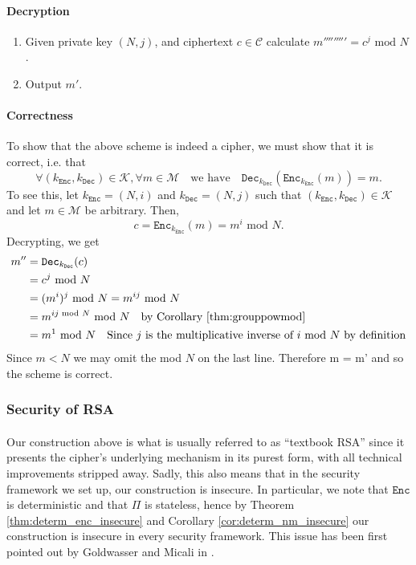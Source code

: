 \documentclass{article}
\theoremstyle{definition}
\newcommand{\Enc}{\texttt{Enc}}
\newcommand{\Dec}{\texttt{Dec}}
\newcommand{\M}{\mathcal{M}}
\renewcommand{\C}{\mathcal{C}}
\newcommand{\K}{\mathcal{K}}
\renewcommand{\mod}{\,\,\text{mod}\,\,}
\begin{document}
\paragraph{Decryption}
\begin{enumerate}
\item Given private key $(N, j)$, and ciphertext $c \in \C$ calculate $m'''''''''= c^j \mod
  N$.
\item Output $m'$.
\end{enumerate}
\paragraph{Correctness} To show that the above scheme is indeed a cipher, we
must show that it is correct, i.e. that
\[
  \forall (k_\Enc, k_\Dec) \in \K, \forall m \in \M\quad\text{we have}\quad
  \Dec_{k_\Dec}(\Enc_{k_\Enc}(m)) = m.
\]
To see this, let $k_\Enc = (N, i)$ and $k_\Dec = (N, j)$ such that $(k_\Enc,
k_\Dec) \in \K$ and let $m \in \M$ be arbitrary. Then,
\[
  c = \Enc_{k_\Enc}(m) = m^i \mod N.
\]
Decrypting, we get
\begin{align*}
  m'' &= \Dec_{k_\Dec}(c) \\
     &= c^j \mod N \\
     &= (m^i)^j \mod N = m^{ij} \mod N \\
     &= m^{ij \mod N} \mod N \quad \text{by Corollary \ref{thm:grouppowmod}} \\
     &= m^1 \mod N \quad \text{Since $j$ is the multiplicative inverse of $i$ mod $N$ by definition}
\end{align*}
Since $m < N$ we may omit the mod $N$ on the last line. Therefore m = m' and so the scheme is correct.
\subsubsection{Security of RSA}
\paragraph{} Our construction above is what is usually referred to as ``textbook
RSA'' since it presents the cipher's underlying mechanism in its purest form,
with all technical improvements stripped away. Sadly, this also means that in
the security framework we set up, our construction is insecure. In particular, we note that
$\Enc$ is deterministic and that $\Pi$ is stateless, hence by Theorem
\ref{thm:determ_enc_insecure} and Corollary \ref{cor:determ_nm_insecure} our
construction is insecure in every security framework. This issue has been first
pointed out by Goldwasser and Micali in \cite{goldwasser1984probabilistic}. 
\end{document}
